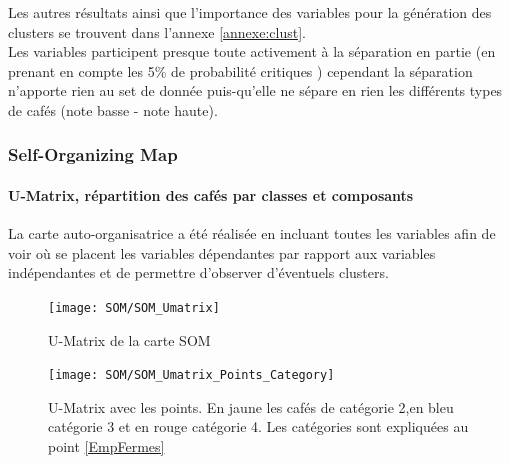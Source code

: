 \noindent Les autres résultats ainsi que l'importance des variables pour la génération des clusters se trouvent dans l'annexe \ref{annexe:clust}.\\


\noindent Les variables participent presque toute activement à la séparation en partie (en prenant en compte les 5\% de probabilité critiques ) cependant la séparation n'apporte rien au set de donnée puis-qu'elle ne sépare en rien les différents types de cafés (note basse - note haute).

























\newpage
\subsubsection{Self-Organizing Map}\label{SOM}

\paragraph{U-Matrix, répartition des cafés par classes et composants} 
La carte auto-organisatrice a été réalisée en incluant toutes les variables afin de voir où se placent les variables dépendantes par rapport aux variables indépendantes et de permettre d'observer d'éventuels clusters. 


\begin{figure}[H]
	\centering
	\texttt{[image: SOM/SOM\_Umatrix]}
	\caption{U-Matrix de la carte SOM}
	\label{}
\end{figure}

\begin{figure}[H]
	\centering
	\texttt{[image: SOM/SOM\_Umatrix\_Points\_Category]}
	\caption{\label{umatrix_cat}U-Matrix avec les points. En jaune les cafés de catégorie 2,en bleu catégorie 3 et en rouge catégorie 4. Les catégories sont expliquées au point \ref{EmpFermes}}
	\label{}
\end{figure}


